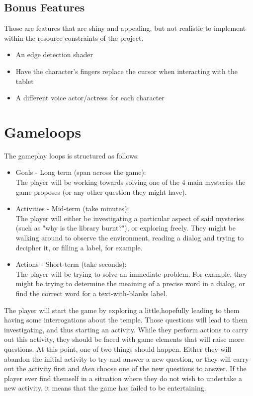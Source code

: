 \documentclass{scrartcl}
\begin{document}
		\subsection{Bonus Features}
			Those are features that are shiny and appealing, but not realistic to implement within the resource constraints of the project.
			\begin{itemize}
				\item An edge detection shader
				\item Have the character's fingers replace the cursor when interacting with the tablet
				\item A different voice actor/actress for each character
			\end{itemize}
	\section{Gameloops}
		The gameplay loops is structured as follows:
		\begin{itemize}
			\item Goals - Long term (span across the game):\\
			The player will be working towards solving one of the 4 main mysteries the game proposes (or any other question they might have).
			\item Activities - Mid-term (take minutes):\\
			The player will either be investigating a particular aspect of said mysteries (such as "why is the library burnt?"), or exploring freely. They might be walking around to observe the environment, reading a dialog and trying to decipher it, or filling a label, for example.
			\item Actions - Short-term (take seconds):\\
			The player will be trying to solve an immediate problem. For example, they might be trying to determine the meaining of a precise word in a dialog, or find the correct word for a text-with-blanks label.
		\end{itemize}
		The player will start the game by exploring a little,hopefully leading to them having some interrogations about the temple. Those questions will lead to them investigating, and thus starting an activity. While they perform actions to carry out this activity, they should be faced with game elements that will raise more questions. At this point, one of two things should happen. Either they will abandon the initial activity to try and answer a new question, or they will carry out the activity first and \textit{then} choose one of the new questions to answer. If the player ever find themself in a situation where they do not wish to undertake a new activity, it means that the game has failed to be entertaining.
\end{document}
